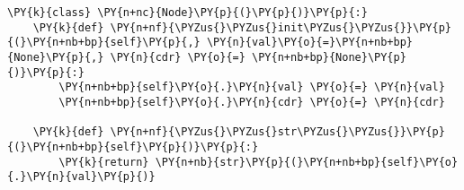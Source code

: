 \begin{Verbatim}[commandchars=\\\{\}]
\PY{k}{class} \PY{n+nc}{Node}\PY{p}{(}\PY{p}{)}\PY{p}{:}
    \PY{k}{def} \PY{n+nf}{\PYZus{}\PYZus{}init\PYZus{}\PYZus{}}\PY{p}{(}\PY{n+nb+bp}{self}\PY{p}{,} \PY{n}{val}\PY{o}{=}\PY{n+nb+bp}{None}\PY{p}{,} \PY{n}{cdr} \PY{o}{=} \PY{n+nb+bp}{None}\PY{p}{)}\PY{p}{:}
        \PY{n+nb+bp}{self}\PY{o}{.}\PY{n}{val} \PY{o}{=} \PY{n}{val}
        \PY{n+nb+bp}{self}\PY{o}{.}\PY{n}{cdr} \PY{o}{=} \PY{n}{cdr}

    \PY{k}{def} \PY{n+nf}{\PYZus{}\PYZus{}str\PYZus{}\PYZus{}}\PY{p}{(}\PY{n+nb+bp}{self}\PY{p}{)}\PY{p}{:}
        \PY{k}{return} \PY{n+nb}{str}\PY{p}{(}\PY{n+nb+bp}{self}\PY{o}{.}\PY{n}{val}\PY{p}{)}
\end{Verbatim}
